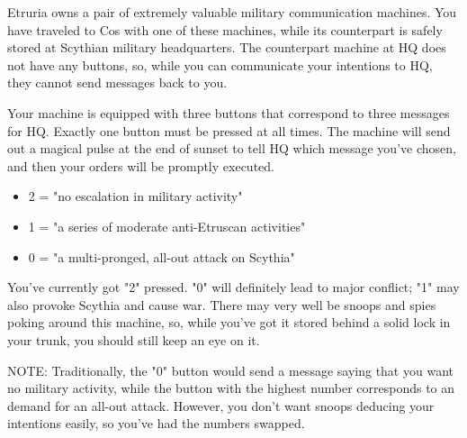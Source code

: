 \documentclass[green]{Kos}
\begin{document}
\name{\gEtruriaMachine{}}

Etruria owns a pair of extremely valuable military communication machines. You have traveled to Cos with one of these machines, while its counterpart is safely stored at Scythian military headquarters. The counterpart machine at HQ does not have any buttons, so, while you can communicate your intentions to HQ, they cannot send messages back to you. 

Your machine is equipped with three buttons that correspond to three messages for HQ. Exactly one button must be pressed at all times. The machine will send out a magical pulse at the end of sunset to tell HQ which message you've chosen, and then your orders will be promptly executed.

\begin{itemize}
\item 2 = "no escalation in military activity"
\item 1 = "a series of moderate anti-Etruscan activities"
\item 0 = "a multi-pronged, all-out attack on Scythia"
\end{itemize}


You've currently got "2" pressed. "0" will definitely lead to major conflict; "1" may also provoke Scythia and cause war. There may very well be snoops and spies poking around this machine, so, while you've got it stored behind a solid lock in your trunk, you should still keep an eye on it.

NOTE: Traditionally, the "0" button would send a message saying that you want no military activity, while the button with the highest number corresponds to an demand for an all-out attack. However, you don't want snoops deducing your intentions easily, so you've had the numbers swapped.
\end{document}
